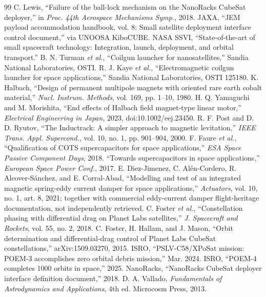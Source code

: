 \documentclass[conference]{IEEEtran}
\begin{document}
\begin{thebibliography}{99}
 C. Lewis, ``Failure of the ball-lock mechanism on the NanoRacks CubeSat deployer,'' in \emph{Proc. 44th Aerospace Mechanisms Symp.}, 2018.
 JAXA, ``JEM payload accommodation handbook, vol. 8: Small satellite deployment interface control document,'' via UNOOSA KiboCUBE.
 NASA SSVI, ``State-of-the-art of small spacecraft technology: Integration, launch, deployment, and orbital transport.''
 B. N. Turman \emph{et al.}, ``Coilgun launcher for nanosatellites,'' Sandia National Laboratories, OSTI.
 R. J. Kaye \emph{et al.}, ``Electromagnetic coilgun launcher for space applications,'' Sandia National Laboratories, OSTI 125180.
 K. Halbach, ``Design of permanent multipole magnets with oriented rare earth cobalt material,'' \emph{Nucl. Instrum. Methods}, vol. 169, pp. 1--10, 1980.
 H. Q. Yamaguchi and M. Morishita, ``End effects of Halbach field magnet-type linear motor,'' \emph{Electrical Engineering in Japan}, 2023, doi:10.1002/eej.23450.
 R. F. Post and D. D. Ryutov, ``The Inductrack: A simpler approach to magnetic levitation,'' \emph{IEEE Trans. Appl. Supercond.}, vol. 10, no. 1, pp. 901--904, 2000.
 F. Faure \emph{et al.}, ``Qualification of COTS supercapacitors for space applications,'' \emph{ESA Space Passive Component Days}, 2018.
 ``Towards supercapacitors in space applications,'' \emph{European Space Power Conf.}, 2017.
 E. Diez-Jimenez, C. Al\'en-Cordero, R. Alcover-S\'anchez, and E. Corral-Abad, ``Modelling and test of an integrated magnetic spring-eddy current damper for space applications,'' \emph{Actuators}, vol. 10, no. 1, art. 8, 2021; together with commercial eddy-current damper flight-heritage documentation, not independently retrieved.
 C. Foster \emph{et al.}, ``Constellation phasing with differential drag on Planet Labs satellites,'' \emph{J. Spacecraft and Rockets}, vol. 55, no. 2, 2018.
 C. Foster, H. Hallam, and J. Mason, ``Orbit determination and differential-drag control of Planet Labs CubeSat constellations,'' arXiv:1509.03270, 2015.
 ISRO, ``PSLV-C58/XPoSat mission: POEM-3 accomplishes zero orbital debris mission,'' Mar. 2024.
 ISRO, ``POEM-4 completes 1000 orbits in space,'' 2025.
 NanoRacks, ``NanoRacks CubeSat deployer interface definition document,'' 2018.
 D. A. Vallado, \emph{Fundamentals of Astrodynamics and Applications}, 4th ed. Microcosm Press, 2013.

\end{thebibliography}
\end{document}
